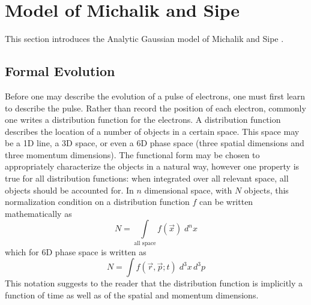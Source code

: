 
\section{Model of Michalik and Sipe}

This section introduces the Analytic Gaussian model of Michalik and Sipe \cite{michalik_analytic_2006}.

\subsection{Formal Evolution} \label{sec:formal_evolution}

Before one may describe the evolution of a pulse of electrons, one must first learn to describe the pulse.
Rather than record the position of each electron, commonly one writes a distribution function for the electrons.
A distribution function describes the location of a number of objects in a certain space.
This space may be a 1D line, a 3D space, or even a 6D phase space (three spatial dimensions and three momentum dimensions).
The functional form may be chosen to appropriately characterize the objects in a natural way, however one property is true for all distribution functions: when integrated over all relevant space, all objects should be accounted for.
In $n$ dimensional space, with $N$ objects, this normalization condition on a distribution function $f$ can be written mathematically as
\begin{equation}
N = \int\limits_{\text{all space}} \!\!\! f(\vec{x}) \; d^{n}x
\end{equation}
which for 6D phase space is written as
\begin{equation} \label{eq:normalization}
N = \int f (\vec{r}, \vec{p}; t) \; d^{3}x\,d^{3}p
\end{equation}
This notation suggests to the reader that the distribution function is implicitly a function of time as well as of the spatial and momentum dimensions.

